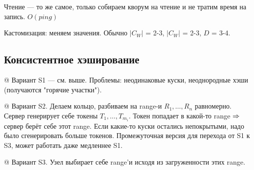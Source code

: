 Чтение --- то же самое, только собираем кворум на чтение и не тратим время на запись.
$O(ping)$

Кастомизация: меняем значения. Обычно
$|C_W|$ = 2-3, $|C_W|$ = 2-3, $D$ = 3-4.

\subsection{Консистентное хэширование}
\begin{el}[ul]
@ Вариант S1 --- см. выше.
Проблемы: неодинаковые куски, неоднородные хэши (получаются "горячие участки").

@ Вариант S2. 
Делаем кольцо, разбиваем на range-и $R_1, \dots, R_n$ равномерно. Сервер генерирует себе токены $T_1, \dots, T_{m_i}$. Токен попадает в какой-то range $\Rightarrow$ сервер берёт себе этот range. Если какие-то куски остались непокрытыми, надо было сгенерировать больше токенов.
Промежуточная версия для перехода от S1 к S3, может работать даже медленнее S1.

@ Вариант S3. Узел выбирает себе range'и исходя из загруженности этих range.
\end{el}


